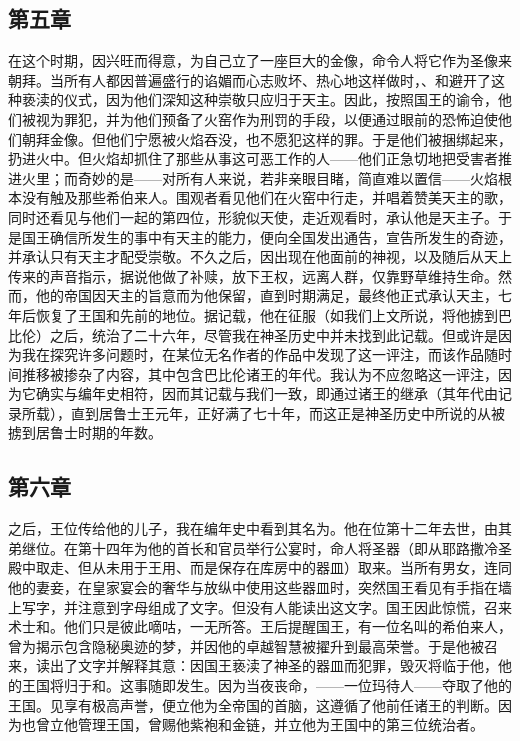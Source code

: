 
\subsection{第五章}

在这个时期，因兴旺而得意，为自己立了一座巨大的金像，命令人将它作为圣像来朝拜。当所有人都因普遍盛行的谄媚而心志败坏、热心地这样做时，、和避开了这种亵渎的仪式，因为他们深知这种崇敬只应归于天主。因此，按照国王的谕令，他们被视为罪犯，并为他们预备了火窑作为刑罚的手段，以便通过眼前的恐怖迫使他们朝拜金像。但他们宁愿被火焰吞没，也不愿犯这样的罪。于是他们被捆绑起来，扔进火中。但火焰却抓住了那些从事这可恶工作的人——他们正急切地把受害者推进火里；而奇妙的是——对所有人来说，若非亲眼目睹，简直难以置信——火焰根本没有触及那些希伯来人。围观者看见他们在火窑中行走，并唱着赞美天主的歌，同时还看见与他们一起的第四位，形貌似天使，走近观看时，承认他是天主子。于是国王确信所发生的事中有天主的能力，便向全国发出通告，宣告所发生的奇迹，并承认只有天主才配受崇敬。不久之后，因出现在他面前的神视，以及随后从天上传来的声音指示，据说他做了补赎，放下王权，远离人群，仅靠野草维持生命。然而，他的帝国因天主的旨意而为他保留，直到时期满足，最终他正式承认天主，七年后恢复了王国和先前的地位。据记载，他在征服（如我们上文所说，将他掳到巴比伦）之后，统治了二十六年，尽管我在神圣历史中并未找到此记载。但或许是因为我在探究许多问题时，在某位无名作者的作品中发现了这一评注，而该作品随时间推移被掺杂了内容，其中包含巴比伦诸王的年代。我认为不应忽略这一评注，因为它确实与编年史相符，因而其记载与我们一致，即通过诸王的继承（其年代由记录所载），直到居鲁士王元年，正好满了七十年，而这正是神圣历史中所说的从被掳到居鲁士时期的年数。\par


\subsection{第六章}

之后，王位传给他的儿子，我在编年史中看到其名为。他在位第十二年去世，由其弟继位。在第十四年为他的首长和官员举行公宴时，命人将圣器（即从耶路撒冷圣殿中取走、但从未用于王用、而是保存在库房中的器皿）取来。当所有男女，连同他的妻妾，在皇家宴会的奢华与放纵中使用这些器皿时，突然国王看见有手指在墙上写字，并注意到字母组成了文字。但没有人能读出这文字。国王因此惊慌，召来术士和。他们只是彼此嘀咕，一无所答。王后提醒国王，有一位名叫的希伯来人，曾为揭示包含隐秘奥迹的梦，并因他的卓越智慧被擢升到最高荣誉。于是他被召来，读出了文字并解释其意：因国王亵渎了神圣的器皿而犯罪，毁灭将临于他，他的王国将归于和。这事随即发生。因为当夜丧命，——一位玛待人——夺取了他的王国。见享有极高声誉，便立他为全帝国的首脑，这遵循了他前任诸王的判断。因为也曾立他管理王国，曾赐他紫袍和金链，并立他为王国中的第三位统治者。\par

